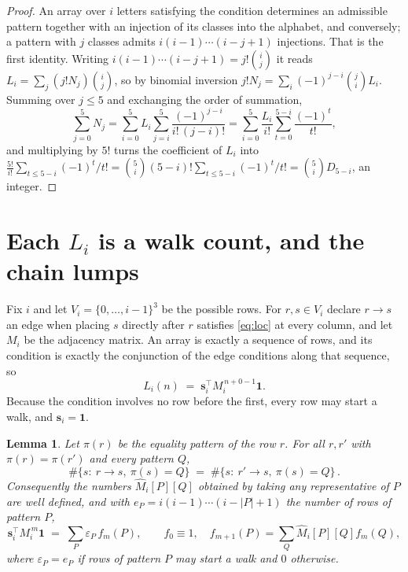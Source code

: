 \documentclass[11pt,a4paper]{article}
\theoremstyle{plain}
\newtheorem{lemma}[theorem]{Lemma}
\theoremstyle{definition}
\begin{document}
\begin{proof}
An array over $i$ letters satisfying the condition determines an admissible pattern together
with an injection of its classes into the alphabet, and conversely; a pattern with $j$
classes admits $i(i-1)\cdots(i-j+1)$ injections. That is the first identity. Writing
$i(i-1)\cdots(i-j+1)=j!\binom{i}{j}$ it reads $L_i=\sum_j (j!N_j)\binom{i}{j}$, so by
binomial inversion $j!N_j=\sum_{i}(-1)^{j-i}\binom{j}{i}L_i$. Summing over
$j\le 5$ and exchanging the order of summation,
\[
\sum_{j=0}^{5}N_j=\sum_{i=0}^{5}L_i\sum_{j=i}^{5}\frac{(-1)^{j-i}}{i!\,(j-i)!}
=\sum_{i=0}^{5}\frac{L_i}{i!}\sum_{t=0}^{5-i}\frac{(-1)^t}{t!} ,
\]
and multiplying by $5!$ turns the coefficient of $L_i$ into
$\frac{5!}{i!}\sum_{t\le 5-i}(-1)^t/t!=\binom{5}{i}(5-i)!\sum_{t\le 5-i}(-1)^t/t!
=\binom{5}{i}D_{5-i}$, an integer.
\end{proof}

\section{Each $L_i$ is a walk count, and the chain lumps}

Fix $i$ and let $V_i=\{0,\dots,i-1\}^{3}$ be the possible rows. For $r,s\in V_i$
declare $r\to s$ an edge when placing $s$ directly after $r$ satisfies \eqref{eq:loc} at
every column, and let $M_i$ be the adjacency matrix. An array is exactly a sequence of
rows, and its condition is exactly the conjunction of the edge conditions along that
sequence, so
\[
L_i(n)\;=\;\mathbf{s}_i^{\!\top}M_i^{\,n+0-1}\mathbf{1} .
\]
Because the condition involves no row before the first, every
row may start a walk, and $\mathbf{s}_i=\mathbf{1}$.

\begin{lemma}\label{lem:lump}
Let $\pi(r)$ be the equality pattern of the row $r$. For all $r,r'$ with
$\pi(r)=\pi(r')$ and every pattern $Q$,
\[
\#\{s:\ r\to s,\ \pi(s)=Q\}\;=\;\#\{s:\ r'\to s,\ \pi(s)=Q\}\, .
\]
Consequently the numbers $\widehat M_i[P][Q]$ obtained by taking any representative of $P$
are well defined, and with $e_P=i(i-1)\cdots(i-|P|+1)$ the number of rows of pattern $P$,
\[
\mathbf{s}_i^{\!\top}M_i^{\,m}\mathbf{1}\;=\;\sum_P \varepsilon_P\,f_m(P),
\qquad f_0\equiv1,\quad f_{m+1}(P)=\sum_Q\widehat M_i[P][Q]f_m(Q),
\]
where $\varepsilon_P=e_P$ if rows of pattern $P$ may start a walk and $0$ otherwise.
\end{lemma}
\end{document}
